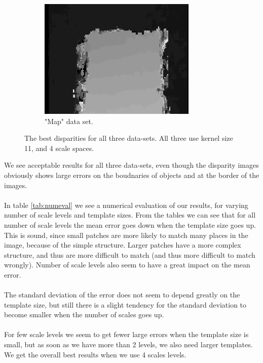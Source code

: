 \documentclass[12pt,a4paper,oneside,final]{article}
\begin{document}
\begin{figure}[H]
\begin{subfigure}[b]{0.32\textwidth}
	\includegraphics[width=\textwidth]{disparity_s4_k11set_3.png}
	\caption{"Map" data set.}
\end{subfigure}
\caption{The best disparities for all three data-sets. All three use kernel size 11, and 4 scale spaces.}
\label{fig:lowlevel}
\end{figure}

We see acceptable results for all three data-sets, even though the disparity images obviously shows large errors on the boudnaries of objects and at the border of the images.\\\\ In table \ref{tab:numeval} we see a numerical evaluation of our results, for varying number of scale levels and template sizes. From the tables we can see that for all number of scale levels the mean error goes down when the template size goes up. This is sound, since small patches are more likely to match many places in the image, because of the simple structure. Larger patches have a more complex structure, and thus are more difficult to match (and thus more difficult to match wrongly). Number of scale levels also seem to have a great impact on the mean error.\\\\ The standard deviation of the error does not seem to depend greatly on the template size, but still there is a slight tendency for the standard deviation to become smaller when the number of scales goes up.\\\\ For few scale levels we seem to get fewer large errors when the template size is small, but as soon as we have more than 2 levels, we also need larger templates. We get the overall best results when we use 4 scales levels.
\end{document}
